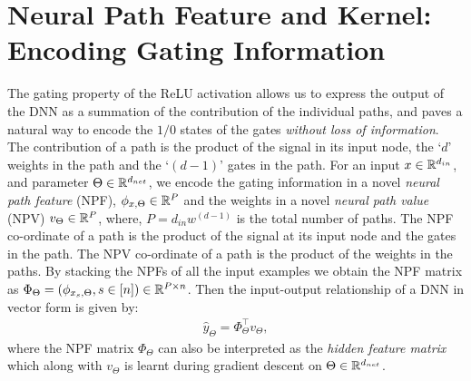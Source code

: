 \section{Neural Path Feature and Kernel: Encoding Gating Information}\label{sec:path}
The gating property of the ReLU activation allows us to express the output of the DNN as a summation of the contribution of the individual paths, and paves a natural way to encode the $1/0$ states of the gates \emph{without loss of information}. The contribution of a path is the product of the signal in its input node, the `$d$' weights in the path and the `$(d-1)$' gates in the path. For an input $x\in\mathbb{R}^{d_{in}}$, and parameter $\Theta\in\mathbb{R}^{d_{net}}$, 
we encode the gating information in a novel \emph{neural path feature} (NPF), $\phi_{x,\Theta}\in\mathbb{R}^P$ and the weights in a novel \emph{neural path value} (NPV) $v_{\Theta}\in\mathbb{R}^P$, where, $P=d_{in}w^{(d-1)}$ is the total number of paths. 
The NPF co-ordinate of a path is the product of the signal at its input node and the gates in the path. The NPV co-ordinate of a path is the product of the weights in the paths. %
By stacking the NPFs of all the input examples we obtain the NPF matrix as $\Phi_{\Theta}=(\phi_{x_s,\Theta},s\in[n])\in\mathbb{R}^{P\times n}$. Then the input-output relationship of a DNN in vector form is given by:
\begin{align}\label{eq:npfnpv}
\hat{y}_{\Theta}=\Phi^\top_{\Theta} v_{\Theta},
\end{align}
where the NPF matrix $\Phi_{\Theta}$ can also be interpreted as the \emph{hidden feature matrix} which along with $v_{\Theta}$ is learnt during gradient descent on $\Theta\in\mathbb{R}^{d_{net}}$. %
\begin{comment}
The associated \emph{neural path kernel} (NPK) matrix defined as $H_{\Theta}=\Phi_{\Theta}^\top \Phi_{\Theta}$, has a special property, in that, it can be written as the \emph{Hadamard} product of the input Gram matrix $\Sigma$, and matrix $\Lambda_{\Theta}$ which is a correlation matrix of active sub-networks. Note that $\Sigma$ is a constant, while $\Lambda_{\Theta}$ is learnt during training.
\end{comment}
